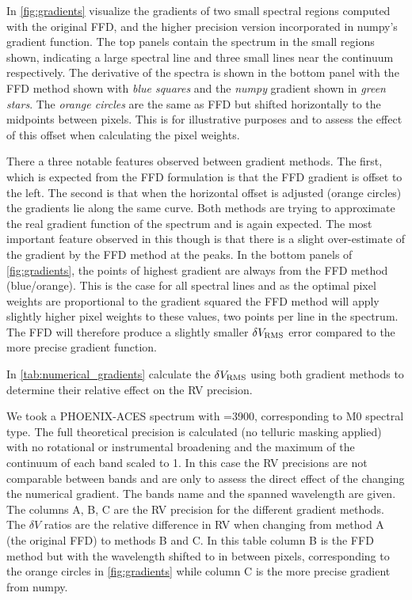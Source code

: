 {

In \cref{fig:gradients}  visualize the gradients of two small spectral regions computed with the original {FFD}, and the higher precision version incorporated in numpy's gradient function.
The top panels contain the spectrum in the small regions shown, indicating a large spectral line and three small lines near the continuum respectively.
The derivative of the spectra is shown in the bottom panel with the {FFD} method shown with \emph{blue squares} and the \emph{numpy} gradient shown in \emph{green stars}.
The \emph{orange circles} are the same as {FFD} but shifted horizontally to the midpoints between pixels.
This is for illustrative purposes and to assess the effect of this offset when calculating the pixel weights.

There a three notable features observed between gradient methods.
The first, which is expected from the {FFD} formulation is that the {FFD} gradient is offset to the left.
The second is that when the horizontal offset is adjusted (orange circles) the gradients lie along the same curve.
Both methods are trying to approximate the real gradient function of the spectrum and is again expected.
The most important feature observed in this though is that there is a slight over-estimate of the gradient by the {FFD} method at the peaks.
In the bottom panels of \cref{fig:gradients}, the points of highest gradient are always from the {FFD} method (blue/orange).
This is the case for all spectral lines and as the optimal pixel weights are proportional to the gradient squared the {FFD} method will apply slightly higher pixel weights to these values, two points per line in the spectrum.
The {FFD} will therefore produce a slightly smaller \(\delta V_{\textrm{RMS}}\) error compared to the more precise gradient function.

In \cref{tab:numerical_gradients}  calculate the  \(\delta V_{\textrm{RMS}}\) using both gradient methods to determine their relative effect on the {RV} precision.

We took a {PHOENIX-ACES} spectrum with \Teff{}=3900\K{}, corresponding to {{M0}} spectral type.
The full theoretical precision is calculated (no telluric masking applied) with no rotational or instrumental broadening and the maximum of the continuum of each band scaled to 1.
In this case the {RV} precisions are not comparable between bands and are only to assess the direct effect of the changing the numerical gradient.
The bands name and the spanned wavelength are given.
The columns A, B, C are the {RV} precision for the different gradient methods.
The \(\delta V\) ratios are the relative difference in {RV} when changing from method A (the original {FFD}) to methods B and C.
In this table column B is the {FFD} method but with the wavelength shifted to in between pixels, corresponding to the orange circles in \cref{fig:gradients} while column C is the more precise gradient from numpy.

}
